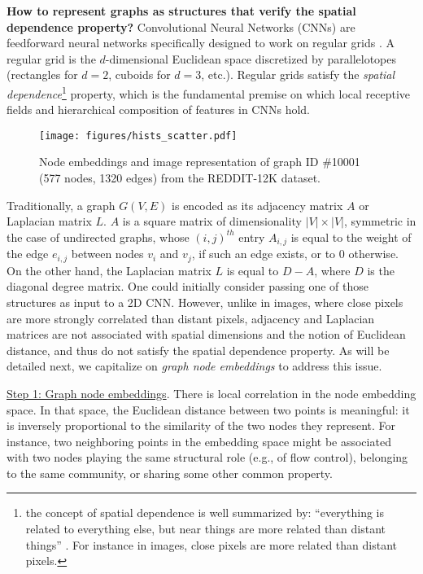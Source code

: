 \documentclass[runningheads]{llncs}
\begin{document}
\noindent \textbf{How to represent graphs as structures that verify the spatial dependence property?} Convolutional Neural Networks (CNNs) are feedforward neural networks specifically designed to work on regular grids \cite{lecun1998gradient}. A regular grid is the $d$-dimensional Euclidean space discretized by parallelotopes (rectangles for $d=2$, cuboids for $d=3$, etc.). Regular grids satisfy the \textit{spatial dependence}\footnote{\scriptsize{the concept of spatial dependence is well summarized by:
``everything is related to everything else, but near things are more related than distant things'' \cite{tobler1970computer}. For instance in images, close pixels are more related than distant pixels.}} property, which is the fundamental premise on which local receptive fields and hierarchical composition of features in CNNs hold.

\vspace{-0.2cm}

\begin{figure*}[h]
  \centering
    \texttt{[image: figures/hists\_scatter.pdf]}
\captionsetup{justification=justified,singlelinecheck=false, size=small}
    \caption{Node embeddings and image representation of graph ID \#10001 (577 nodes, 1320 edges) from the REDDIT-12K dataset.}
    \label{fig:hist_scatter}
\end{figure*}

\vspace{-0.4cm}

Traditionally, a graph $G(V,E)$ is encoded as its adjacency matrix $A$ or Laplacian matrix $L$. $A$ is a square matrix of dimensionality $|V| \times |V|$, symmetric in the case of undirected graphs, whose $(i,j)^{th}$ entry $A_{i,j}$ is equal to the weight of the edge $e_{i,j}$ between nodes $v_{i}$ and $v_{j}$, if such an edge exists, or to 0 otherwise. On the other hand, the Laplacian matrix $L$ is equal to $D-A$, where $D$ is the diagonal degree matrix. One could initially consider passing one of those structures as input to a 2D CNN. However, unlike in images, where close pixels are more strongly correlated than distant pixels, adjacency and Laplacian matrices are not associated with spatial dimensions and the notion of Euclidean distance, and thus do not satisfy the spatial dependence property. As will be detailed next, we capitalize on \textit{graph node embeddings} to address this issue.

\underline{Step 1: Graph node embeddings}. There is local correlation in the node embedding space. In that space, the Euclidean distance between two points is meaningful: it is inversely proportional to the similarity of the two nodes they represent. For instance, two neighboring points in the embedding space might be associated with two nodes playing the same structural role (e.g., of flow control), belonging to the same community, or sharing some other common property.
\end{document}
